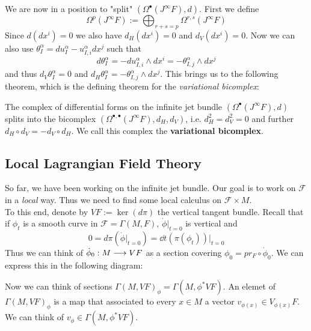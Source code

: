 We are now in a position to "split" $(\Omega^\bullet(J^\infty F), d)$. First we define
$$ \Omega^p (J^\infty F) := \bigoplus_{r+s=p} \Omega^{r,s}(J^\infty F) $$
Since $d(dx^i)=0$ we also have $d_H(dx^i) = 0$ and $d_V(dx^i) = 0$. Now we can also use $\theta^\alpha_I = du^\alpha_I - u^\alpha_{I,i} dx^j$ such that
$$ d \theta^\alpha_I = -d u^\alpha_{I,i} \wedge dx^i = - \theta^\alpha_{I,j} \wedge dx^j $$
and thus $d_V \theta^\alpha_I = 0$ and $d_H \theta^\alpha_I = - \theta^\alpha_{I,j} \wedge dx^j$. This brings us to the following theorem, which is the defining theorem for the \emph{variational bicomplex}:

\begin{theo}
  The complex of differential forms on the infinite jet bundle $(\Omega^\bullet(J^\infty F), d)$ splits into the bicomplex $(\Omega^{\bullet, \bullet}(J^\infty F), d_H, d_V)$, i.e. $d^2_H = d_V^2 = 0$ and further $d_H \circ d_V = -d_V \circ d_H$. We call this complex the \textbf{variational bicomplex}.
\end{theo}


\newpage
\subsection{Local Lagrangian Field Theory}

So far, we have been working on the infinite jet bundle. Our goal is to work on $\mathcal{F}$ in a \emph{local} way. Thus we need to find some local calculus on $\mathcal{F}\times M$.\\

To this end, denote by $VF:=\ker(d\pi)$ the vertical tangent bundle. Recall that if $\phi_t$ is a smooth curve in $\mathcal{F} = \Gamma(M, F)$, $\dot\phi\big|_{t=0}$ is vertical and
$$0 = d\pi(\dot\phi\big|_{t=0}) = \dd{}{t}(\pi(\phi_t))\big|_{t=0}$$
Thus we can think of $\dot \phi_0 : M \lra VF$ as a section covering $\phi_0 = pr_F \circ \dot \phi_0$. We can express this in the following diagram:\\
\begin{center}
\end{center}

Now we can think of sections $\Gamma(M, VF)_\phi = \Gamma(M, \phi^*VF)$. An elemet of $\Gamma(M, VF)_\phi$ is a map that associated to every $x\in M$ a vector $v_{\phi(x)} \in V_{\phi(x)}F$. We can think of $v_\phi \in \Gamma(M, \phi^*VF)$.

